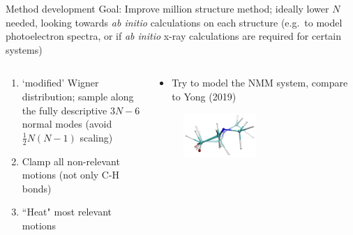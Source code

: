 \documentclass{beamer}
\begin{document}
\begin{frame}{Method development}
				Goal: Improve million structure method; ideally lower $N$ needed, looking towards \textit{ab initio} calculations on each structure (e.g.\ to model photoelectron spectra, or if \textit{ab initio} x-ray calculations are required for certain systems)  
	\begin{columns} 
		\begin{column}{.6\textwidth}
			\begin{enumerate}
				\item `modified' Wigner distribution; sample along the fully descriptive $3N-6$ normal modes (avoid $\frac{1}{2}N(N-1)$ scaling)
				\item Clamp all non-relevant motions (not only C-H bonds)
				\item ``Heat" most relevant motions	
			\end{enumerate}
		\end{column}
		\begin{column}{.4\textwidth}
			\begin{itemize}
				\item Try to model the NMM system, compare to Yong (2019)
			\end{itemize}
		\begin{figure}
			\centering
			\includegraphics[width=0.5\textwidth]{allmodes_1m_2m_frame10_comparison.png}
		\end{figure}
		\end{column}%
	\end{columns}
\end{frame}
\end{document}
